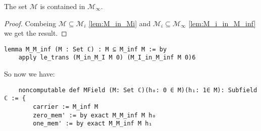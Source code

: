 \begin{lemma}
    The set $\mathcal{M}$ is contained in $\mathcal{M}_{\infty}$.
\end{lemma}

\begin{proof}
    Combeing $\mathcal{M} \subseteq \mathcal{M}_i$ \ref{lem:M_in_Mi} and $\mathcal{M}_i \subseteq \mathcal{M}_{\infty}$ \ref{lem:M_i_in_M_inf} we get the result.
\end{proof}

\begin{lstlisting}
lemma M_M_inf (M : Set ℂ) : M ⊆ M_inf M := by 
    apply le_trans (M_in_M_I M 0) (M_I_in_M_inf M 0)6
\end{lstlisting}

So now we have:
\begin{lstlisting}
    noncomputable def MField (M: Set ℂ)(h₀: 0 ∈ M)(h₁: 1∈ M): Subfield ℂ := {
        carrier := M_inf M
        zero_mem' := by exact M_M_inf M h₀
        one_mem' := by exact M_M_inf M h₁
\end{lstlisting}